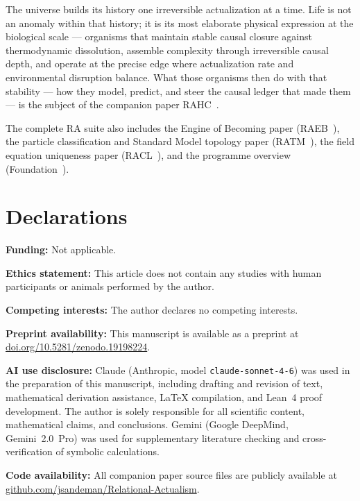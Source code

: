 \documentclass[11pt,a4paper]{article}
\theoremstyle{plain}
\theoremstyle{definition}
\theoremstyle{remark}
\begin{document}
The universe builds its history one irreversible actualization at a time. Life is
not an anomaly within that history; it is its most elaborate physical expression
at the biological scale --- organisms that maintain stable causal closure against
thermodynamic dissolution, assemble complexity through irreversible causal depth,
and operate at the precise edge where actualization rate and environmental
disruption balance. What those organisms then do with that stability --- how they
model, predict, and steer the causal ledger that made them --- is the subject of
the companion paper RAHC~\citep{Sandeman2026RAHC}.

The complete RA suite also includes the Engine of Becoming paper
(RAEB~\citep{Sandeman2026RAEB}), the particle classification and Standard Model
topology paper (RATM~\citep{Sandeman2026RATM}), the field equation uniqueness
paper (RACL~\citep{Sandeman2026RACL}), and the programme overview
(Foundation~\citep{Sandeman2026Foundation}).


\section*{Declarations}
\textbf{Funding:} Not applicable.

\textbf{Ethics statement:} This article does not contain any studies with human participants or animals performed by the author.

\quad
\textbf{Competing interests:} The author declares no competing interests.

\textbf{Preprint availability:} This manuscript is available as a preprint at
\href{https://doi.org/10.5281/zenodo.19198224}{doi.org/10.5281/zenodo.19198224}.

\textbf{AI use disclosure:} Claude (Anthropic, model \texttt{claude-sonnet-4-6}) was used in the preparation of this manuscript, including drafting and revision of text, mathematical derivation assistance, \LaTeX{} compilation, and Lean~4 proof development. The author is solely responsible for all scientific content, mathematical claims, and conclusions. Gemini (Google DeepMind, Gemini~2.0~Pro) was used for supplementary literature checking and cross-verification of symbolic calculations.


\textbf{Code availability:} All companion paper source files are publicly available at \href{https://github.com/jsandeman/Relational-Actualism}{github.com/jsandeman/Relational-Actualism}.
\end{document}
